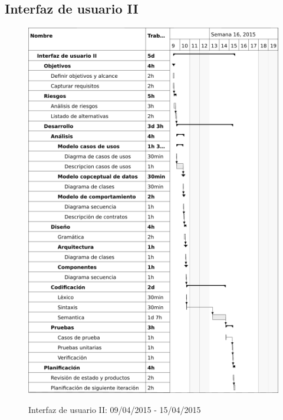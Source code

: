 \subsection{Interfaz de usuario II}
\begin{center}
\begin{figure}[H]
\centering
\includegraphics[scale=1]{planning/21-interfaz-usuario-ii.png} \\
\caption{Interfaz de usuario II: 09/04/2015 - 15/04/2015 }
\end{figure}
\end{center}


